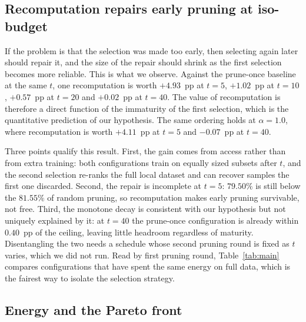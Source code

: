 \documentclass[conference]{IEEEtran}
\begin{document}
\subsection{Recomputation repairs early pruning at iso-budget}\label{sec:res-recompute}

If the problem is that the selection was made too early, then selecting again later
should repair it, and the size of the repair should shrink as the first selection
becomes more reliable. This is what we observe. Against the prune-once baseline at
the same $t$, one recomputation is worth $+4.93$~pp at $t=5$, $+1.02$~pp at $t=10$,
$+0.57$~pp at $t=20$ and $+0.02$~pp at $t=40$. The value of recomputation is
therefore a direct function of the immaturity of the first selection, which is the
quantitative prediction of our hypothesis. The same ordering holds at $\alpha=1.0$,
where recomputation is worth $+4.11$~pp at $t=5$ and $-0.07$~pp at $t=40$.

Three points qualify this result. First, the gain comes from access rather than from extra
training: both configurations train on equally sized subsets after $t$, and the second selection
re-ranks the full local dataset and can recover samples the first one
discarded. Second, the repair is incomplete at $t=5$: $79.50\%$ is still below the
$81.55\%$ of random pruning, so recomputation makes early pruning survivable, not
free. Third, the monotone decay is consistent with our hypothesis but not uniquely
explained by it: at $t=40$ the prune-once configuration is already within $0.40$~pp of the
ceiling, leaving little headroom regardless of maturity. Disentangling the two needs a
schedule whose second pruning round is fixed as $t$ varies, which we did not run.
Read by first pruning round, Table~\ref{tab:main} compares configurations that have
spent the same energy on full data, which is the fairest way to isolate the selection
strategy.

\subsection{Energy and the Pareto front}\label{sec:res-energy}
\end{document}
